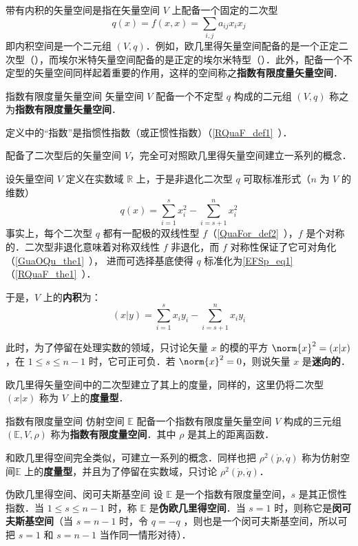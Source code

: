 
\begin{issues}
\issueDraft
\end{issues}

带有内积的矢量空间是指在矢量空间 $V$ 上配备一个固定的二次型
\begin{equation}
q(x)=f(x,x)=\sum_{i,j}a_{ij}x_ix_j
\end{equation}
 即内积空间是一个二元组 $(V,q)$．例如，欧几里得矢量空间配备的是一个正定二次型（），而埃尔米特矢量空间配备的是正定的埃尔米特型（）．此外，配备一个不定型的矢量空间同样起着重要的作用，这样的空间称之\textbf{指数有限度量矢量空间}．

 \begin{definition}{指数有限度量矢量空间}
 矢量空间 $V$ 配备一个不定型 $q$ 构成的二元组 $(V,q)$ 称之为\textbf{指数有限度量矢量空间}．
 \end{definition}
定义中的“指数”是指惯性指数（或正惯性指数）（\autoref{RQuaF_def1}~）．

配备了二次型后的矢量空间 $V$，完全可对照欧几里得矢量空间建立一系列的概念．

设矢量空间 $V$ 定义在实数域 $\mathbb R$ 上，于是非退化二次型 $q$ 可取标准形式（$n$ 为 $V$ 的维数）
\begin{equation}\label{EFSp_eq1}
q(x)=\sum_{i=1}^s x_i^2-\sum_{i=s+1}^n x_i^2
\end{equation}
事实上，每个二次型 $q$ 都有一配极的双线性型 $f$（\autoref{QuaFor_def2}~），$f$ 是个对称的．二次型非退化意味着对称双线性 $f$ 非退化，而 $f$ 对称性保证了它可对角化（\autoref{GuaOQu_the1}~）， 进而可选择基底使得 $q$ 标准化为\autoref{EFSp_eq1} （\autoref{RQuaF_the1}~）．

于是，$V$ 上的\textbf{内积}为：
\begin{equation}
(x|y)=\sum_{i=1}^{s}x_iy_i-\sum_{i=s+1}^{n}x_{i}y_i
\end{equation}

此时，为了停留在处理实数的领域，只讨论矢量 $x$ 的模的平方 $\norm{x}^2=(x|x)$，在 $1\leq s\leq n-1$ 时，它可正可负．若 $\norm{x}^2=0$，则说矢量 $x$ 是\textbf{迷向的}．

欧几里得矢量空间中的二次型建立了其上的度量，同样的，这里仍将二次型 $(x|x)$ 称为 $V$ 上的\textbf{度量型}．
\begin{definition}{指数有限度量空间}
 仿射空间 $\mathbb E$ 配备一个指数有限度量矢量空间 $V$ 构成的三元组 $(\mathbb E,V,\rho)$ 称为\textbf{指数有限度量空间}．其中 $\rho$ 是其上的距离函数．
 \end{definition}
 和欧几里得空间完全类似，可建立一系列的概念．同样也把 $\rho^2(\dot p,\dot q)$ 称为仿射空间$\mathbb E$ 上的\textbf{度量型}，并且为了停留在实数域，只讨论 $\rho^2(\dot p,\dot q)$．

\begin{definition}{伪欧几里得空间、闵可夫斯基空间}
设 $\mathbb E$ 是一个指数有限度量空间，$s$ 是其正惯性指数．当 $1\leq s\leq n-1$ 时，称 $\mathbb E$ 是\textbf{伪欧几里得空间}．当 $s=1$ 时，则称它是\textbf{闵可夫斯基空间}（当 $s=n-1$ 时，令 $q=-q$ ，则也是一个闵可夫斯基空间，所以可把 $s=1$ 和 $s=n-1$ 当作同一情形对待）．
\end{definition}